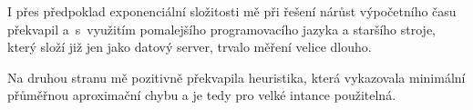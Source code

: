 \documentclass[11pt]{article}
\begin{document}
I přes předpoklad exponenciální složitosti mě při řešení nárůst výpočetního času překvapil a~s~využitím pomalejšího programovacího jazyka a staršího stroje, který složí již jen jako datový server, trvalo měření velice dlouho. 

Na druhou stranu mě pozitivně překvapila heuristika, která vykazovala minimální přůměřnou aproximační chybu a je tedy pro velké intance použitelná.
\end{document}
